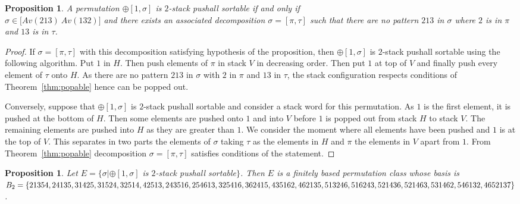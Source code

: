 \documentclass[11pt]{article}
\newtheorem{prop}[thm]{Proposition}
\newcommand{\pushall}{$2$-stack pushall sortable\xspace}
\begin{document}
\begin{prop}
\label{prop:+[1,x]pt}
A permutation $\oplus[1,\sigma]$ is \pushall if and only if \\
$\sigma \in \big[Av(213)\ Av(132)\big]$ and there exists an associated decomposition $\sigma = [\pi ,\tau]$ 
such that there are no pattern $213$ in $\sigma$ where $2$ is in $\pi$ and $13$ is in $\tau$.
\end{prop}
\begin{proof}
If $\sigma = [\pi,\tau]$ with this decomposition satisfying hypothesis of the proposition, then $\oplus[1,\sigma]$ is \pushall using the following algorithm. 
Put $1$ in $H$. 
Then push elements of $\pi$ in stack $V$ in decreasing order. 
Then put $1$ at top of $V$ and finally push every element of $\tau$ onto $H$. 
As there are no pattern $213$ in $\sigma$ with $2$ in $\pi$ and $13$ in $\tau$, the stack configuration respects conditions of Theorem~\ref{thm:popable} hence can be popped out.

Conversely, suppose that $\oplus[1, \sigma]$ is \pushall and consider a stack word for this permutation. 
As $1$ is the first element, it is pushed at the bottom of $H$. 
Then some elements are pushed onto $1$ and into $V$ before $1$ is popped out from stack $H$ to stack $V$. 
The remaining elements are pushed into $H$ as they are greater than $1$. 
We consider the moment where all elements have been pushed and $1$ is at the top of $V$. 
This separates in two parts the elements of $\sigma$ taking $\tau$ as the elements in $H$ and $\pi$ the elements in $V$ apart from $1$. 
From Theorem~\ref{thm:popable} decomposition $\sigma = [\pi ,\tau]$ satisfies conditions of the statement.
\end{proof}

\begin{prop}
\label{prop:B2}
Let $E = \{ \sigma | \oplus[1,\sigma]$ is \pushall $\}$. 
Then $E$ is a finitely based permutation class whose basis is $B_2 = \{ 21354, 24135, 31425, 31524, 32514, 42513, 243516, 254613, \linebreak[1] 325416, \linebreak[1] 362415, 435162, 462135, 513246, 516243, 521436, 521463, 531462, 546132, 4652137 \}$.
\end{prop}
\end{document}
